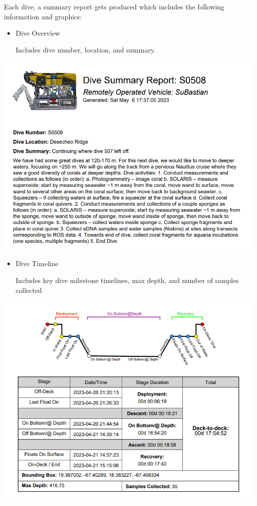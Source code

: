 \documentclass[
  letterpaper,
  DIV=11,
  numbers=noendperiod]{scrreprt}
\begin{document}
Each dive, a summary report gets produced which includes the following
information and graphics:

\begin{itemize}
\item
  Dive Overview

  Includes dive number, location, and summary.
\end{itemize}

\includegraphics{images/image6.png}

\begin{itemize}
\item
  Dive Timeline

  Includes key dive milestone timelines, max depth, and number of
  samples collected
\end{itemize}

\includegraphics{images/image12.png}
\end{document}
